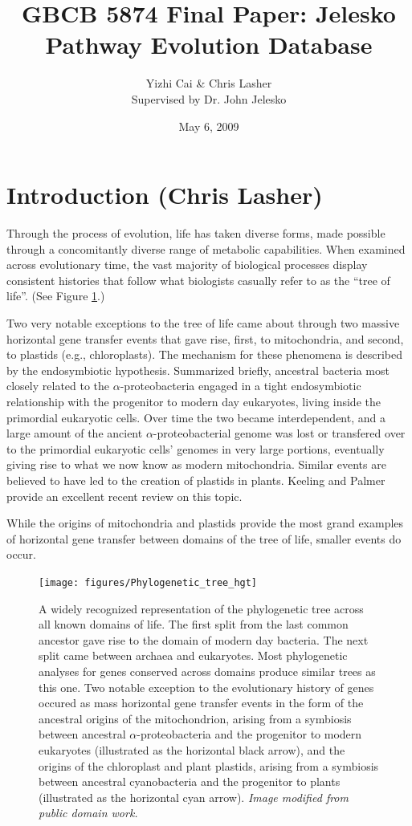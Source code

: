 \documentclass[11pt,letterpaper,twoside,english]{article}
\author{Yizhi Cai \& Chris Lasher\\
Supervised by Dr. John Jelesko}
\title{GBCB 5874 Final Paper: Jelesko Pathway Evolution Database}
\date{May 6, 2009}
\begin{document}
\maketitle

\section{Introduction (Chris Lasher)}

Through the process of evolution, life has taken diverse forms, made possible
through a concomitantly diverse range of metabolic capabilities. When examined
across evolutionary time, the vast majority of biological processes display
consistent histories that follow what biologists casually refer to as the
``tree of life''. (See Figure \ref{fig:tree_of_life}.)

Two very notable exceptions to the tree of life came about through two massive
horizontal gene transfer events that gave rise, first, to mitochondria, and
second, to plastids (e.g., chloroplasts). The mechanism for these phenomena is
described by the endosymbiotic hypothesis. Summarized briefly, ancestral
bacteria most closely related to the $\alpha$-proteobacteria engaged in a
tight endosymbiotic relationship with the progenitor to modern day eukaryotes,
living inside the primordial eukaryotic cells. Over time the two became
interdependent, and a large amount of the ancient $\alpha$-proteobacterial
genome was lost or transfered over to the primordial eukaryotic cells' genomes
in very large portions, eventually giving rise to what we now know as modern
mitochondria. Similar events are believed to have led to the creation of
plastids in plants. Keeling and Palmer \cite{keeling_horizontal_2008} provide
an excellent recent review on this topic.

While the origins of mitochondria and plastids provide the most grand examples
of horizontal gene transfer between domains of the tree of life, smaller
events do occur.

\begin{figure}[htbp]
    \begin{center}
        \texttt{[image: figures/Phylogenetic\_tree\_hgt]}
    \end{center}
    \caption{A widely recognized representation of the phylogenetic tree
    across all known domains of life. The first split from the last common
    ancestor gave rise to the domain of modern day bacteria. The next split
    came between archaea and eukaryotes. Most phylogenetic analyses for genes
    conserved across domains produce similar trees as this one. Two notable
    exception to the evolutionary history of genes occured as mass horizontal
    gene transfer events in the form of the ancestral origins of the
    mitochondrion, arising from a symbiosis between ancestral
    $\alpha$-proteobacteria and the progenitor to modern eukaryotes
    (illustrated as the horizontal black arrow), and the origins of the
    chloroplast and plant plastids, arising from a symbiosis between ancestral
    cyanobacteria and the progenitor to plants (illustrated as the horizontal
    cyan arrow). \textit{Image modified from public domain work.}}
    \label{fig:tree_of_life}
\end{figure}
\end{document}
